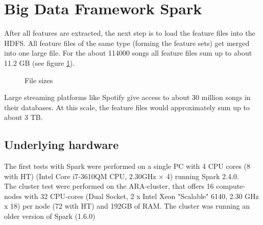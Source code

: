 
\section{Big Data Framework Spark}\label{bds1}

After all features are extracted, the next step is to load the feature files into the HDFS.
All feature files of the same type (forming the feature sets) get merged into one large file. For the about 114000 songs all feature files sum up to about 11.2 GB (see figure \ref{filesize}). 

\begin{figure}[htbp]
	\centering
	\caption{File sizes}
	\label{filesize}
\end{figure}

\noindent Large streaming platforms like Spotify give access to about 30 million songs in their databases. At this scale, the feature files would approximately sum up to about 3 TB.\\

\subsection{Underlying hardware}

The first tests with Spark were performed on a single PC with 4 CPU cores (8 with HT) (Intel Core i7-3610QM CPU, 2.30GHz × 4) running Spark 2.4.0.\\ The cluster test were performed on the ARA-cluster, that offers 16 compute-nodes with 32 CPU-cores (Dual Socket, 2 x Intel Xeon "Scalable" 6140, 2.30 GHz x 18) per node (72 with HT) and 192GB of RAM. The cluster was running an older version of Spark (1.6.0)\\

